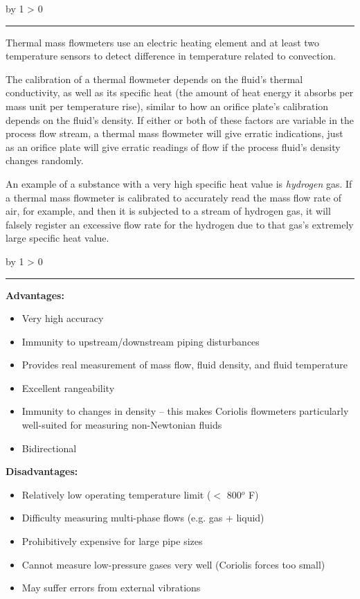 \documentclass[12pt,a4paper]{article}
\def\svar{
           \advance\answnum by 1
           \ifnum \answnum > 0
                \hrule
                \vskip 3pt
                \leftline{Svar \the\answnum}
                \vskip 3pt \fi}
\begin{document}
\vskip 10pt \filbreak 
\svar{} 

Thermal mass flowmeters use an electric heating element and at least two temperature sensors to detect difference in temperature related to convection.  

The calibration of a thermal flowmeter depends on the fluid's thermal conductivity, as well as its specific heat (the amount of heat energy it absorbs per mass unit per temperature rise), similar to how an orifice plate's calibration depends on the fluid's density.  If either or both of these factors are variable in the process flow stream, a thermal mass flowmeter will give erratic indications, just as an orifice plate will give erratic readings of flow if the process fluid's density changes randomly.

\vskip 10pt

An example of a substance with a very high specific heat value is {\it hydrogen} gas.  If a thermal mass flowmeter is calibrated to accurately read the mass flow rate of air, for example, and then it is subjected to a stream of hydrogen gas, it will falsely register an excessive flow rate for the hydrogen due to that gas's extremely large specific heat value.

\vskip 10pt \filbreak 
\svar{} 

{\bf Advantages:}

\begin{itemize}
\item{} Very high accuracy
\item{} Immunity to upstream/downstream piping disturbances
\item{} Provides real measurement of mass flow, fluid density, and fluid temperature
\item{} Excellent rangeability
\item{} Immunity to changes in density -- this makes Coriolis flowmeters particularly well-suited for measuring non-Newtonian fluids
\item{} Bidirectional
\end{itemize}

\vskip 10pt

{\bf Disadvantages:}

\begin{itemize}
\item{} Relatively low operating temperature limit ($<$ 800$^{o}$ F)
\item{} Difficulty measuring multi-phase flows (e.g. gas + liquid)
\item{} Prohibitively expensive for large pipe sizes
\item{} Cannot measure low-pressure gases very well (Coriolis forces too small)
\item{} May suffer errors from external vibrations
\end{itemize}
\end{document}
